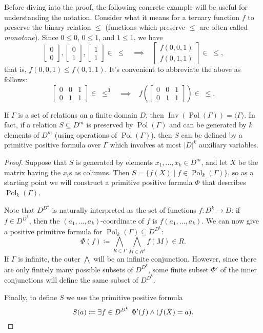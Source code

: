 \documentclass[letterpaper,11pt]{article}
\DeclareMathOperator{\Pol}{Pol}
\DeclareMathOperator{\Inv}{Inv}
\begin{document}
Before diving into the proof, the following concrete example will be useful for understanding the notation. Consider what it means for a ternary function $f$ to preserve the binary relation $\le$ (functions which preserve $\le$ are often called \emph{monotone}). Since $0 \le 0$, $0 \le 1$, and $1 \le 1$, we have
\[
\begin{bmatrix} 0\\ 0 \end{bmatrix}, \begin{bmatrix} 0\\ 1 \end{bmatrix}, \begin{bmatrix} 1\\ 1 \end{bmatrix} \in \; \le \;\;\; \implies \;\;\; \begin{bmatrix} f(0,0,1)\\ f(0,1,1) \end{bmatrix} \in \; \le,
\]
that is, $f(0,0,1) \le f(0,1,1)$. It's convenient to abbreviate the above as follows:
\[
\begin{bmatrix} 0 & 0 & 1\\ 0 & 1 & 1 \end{bmatrix} \in \; \le^3 \;\;\; \implies \;\;\; f\left(\begin{bmatrix} 0 & 0 & 1\\ 0 & 1 & 1 \end{bmatrix}\right) \in \; \le.
\]

\begin{thm} If $\Gamma$ is a set of relations on a finite domain $D$, then $\Inv(\Pol(\Gamma)) = \langle \Gamma \rangle$. In fact, if a relation $S \subseteq D^m$ is preserved by $\Pol(\Gamma)$ and can be generated by $k$ elements of $D^m$ (using operations of $\Pol(\Gamma)$), then $S$ can be defined by a primitive positive formula over $\Gamma$ which involves at most $|D|^k$ auxiliary variables.
\end{thm}
\begin{proof} Suppose that $S$ is generated by elements $x_1, ..., x_k \in D^m$, and let $X$ be the matrix having the $x_i$s as columns. Then $S = \{f(X) \mid f \in \Pol_k(\Gamma)\}$, so as a starting point we will construct a primitive positive formula $\Phi$ that describes $\Pol_k(\Gamma)$.

Note that $D^{D^k}$ is naturally interpreted as the set of functions $f : D^k \rightarrow D$: if $f \in D^{D^k}$, then the $(a_1, ..., a_k)$-coordinate of $f$ is $f(a_1, ..., a_k)$. We can now give a positive primitive formula for $\Pol_k(\Gamma) \subseteq D^{D^k}$:
\[
\Phi(f) \coloneqq \bigwedge_{R \in \Gamma} \bigwedge_{M \in R^k} f(M) \in R.
\]
If $\Gamma$ is infinite, the outer $\bigwedge$ will be an infinite conjunction. However, since there are only finitely many possible subsets of $D^{D^k}$, some finite subset $\Phi'$ of the inner conjunctions will define the same subset of $D^{D^k}$.

Finally, to define $S$ we use the primitive positive formula
\[
S(a) \coloneqq \exists f \in D^{D^k}\ \Phi'(f) \wedge (f(X) = a).\qedhere
\]
\end{proof}
\end{document}
